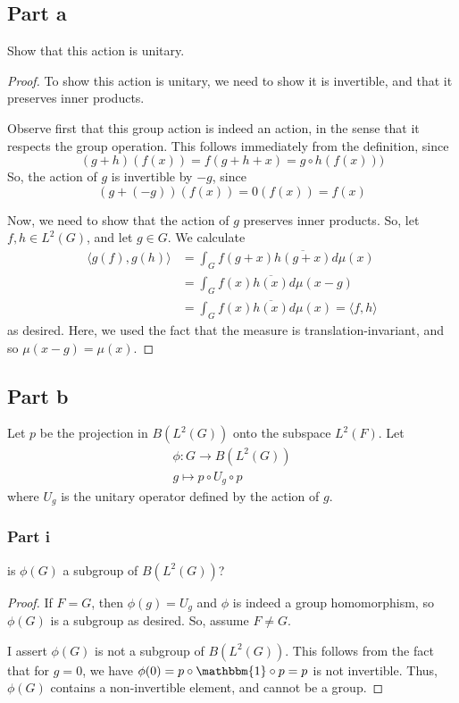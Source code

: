 \documentclass[fontsize=11pt]{scrartcl} %
\numberwithin{equation}{section} %
\numberwithin{figure}{section} %
\numberwithin{table}{section} %
\begin{document}
\subsection*{Part a}
Show that this action is unitary.

\begin{proof}
    To show this action is unitary, we need to show it is invertible, and that
    it preserves inner products.

    Observe first that this group action is indeed an action, in the sense that
    it respects the group operation. This follows immediately from the
    definition, since
    \[
        (g+h)(f(x)) = f(g+h+x) = g\circ h(f(x)))
    \]
    So, the action of $g$ is invertible by $-g$, since
    \[
        (g+(-g))(f(x)) = 0(f(x)) = f(x)
    \]

    Now, we need to show that the action of $g$ preserves inner products. So,
    let $f,h\in L^2(G)$, and let $g\in G$. We calculate
    \[
\begin{aligned}
    \langle g(f),g(h)\rangle &= \int_Gf(g+x)\overline{h(g+x)}d\mu(x)\\
    &=\int_Gf(x)\overline{h(x)}d\mu(x-g)\\
    &=\int_Gf(x)\overline{h(x)}d\mu(x) = \langle f,h\rangle
\end{aligned}
    \]
    as desired. Here, we used the fact that the measure is
    translation-invariant, and so $\mu(x-g)=\mu(x)$.
\end{proof}

\subsection*{Part b}
Let $p$ be the projection in $B(L^2(G))$ onto the subspace $L^2(F)$. Let
\[
    \begin{aligned}
        \phi:G\to B(L^2(G))\\
        g\mapsto p\circ U_g\circ p
    \end{aligned}
\]
where $U_g$ is the unitary operator defined by the action of $g$.

\subsubsection*{Part i}
is $\phi(G)$ a subgroup of $B(L^2(G))$?

\begin{proof}
    If $F=G$, then $\phi(g) = U_g$ and $\phi$ is indeed a group homomorphism, so
    $\phi(G)$ is a subgroup as desired. So, assume $F\neq G$.

    I assert $\phi(G)$ is not a subgroup of $B(L^2(G))$. This follows from the
    fact that for $g=0$, we have $\phi(0) = p\circ \mathbbm{1}\circ p =p$ is not
    invertible. Thus, $\phi(G)$ contains a non-invertible element, and cannot be
    a group.
\end{proof}
\end{document}
